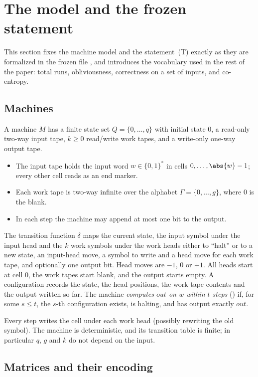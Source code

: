 \section{The model and the frozen statement}\label{sec:model}

This section fixes the machine model and the statement~(T) exactly as they are formalized in the
frozen file , and introduces the vocabulary used in the rest of
the paper: total runs, obliviousness, correctness on a set of inputs, and co-entropy.

\subsection{Machines}

A machine $M$ has a finite state set $Q=\{0,\dots,q\}$ with initial state $0$, a read-only
two-way input tape, $k\ge 0$ read/write work tapes, and a write-only one-way output tape.
\begin{itemize}[leftmargin=2em]
\item The input tape holds the input word $w\in\{0,1\}^*$ in cells $0,\dots,\abs{w}-1$; every
other cell reads as an end marker.
\item Each work tape is two-way infinite over the alphabet $\Gamma=\{0,\dots,g\}$, where $0$ is the
blank.
\item In each step the machine may append at most one bit to the output.
\end{itemize}
The transition function $\delta$ maps the current state, the input symbol under the input head and
the $k$ work symbols under the work heads either to ``halt'' or to a new state, an input-head move,
a symbol to write and a head move for each work tape, and optionally one output bit. Head moves
are $-1$, $0$ or $+1$. All heads start at cell $0$, the work tapes start blank, and the output
starts empty. A configuration records the state, the head positions, the work-tape contents and the
output written so far. The machine \emph{computes $\mathit{out}$ on $w$ within $t$ steps}
() if, for some $s\le t$, the $s$-th configuration exists, is
halting, and has output exactly $\mathit{out}$.

Every step writes the cell under each work head (possibly rewriting the old symbol). The machine
is deterministic, and its transition table is finite; in particular $q$, $g$ and $k$ do not depend
on the input.

\subsection{Matrices and their encoding}

